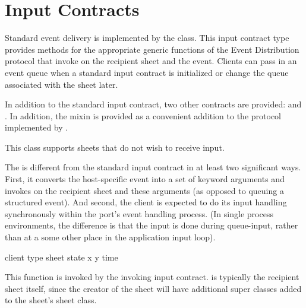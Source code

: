 {%


\section {Input Contracts}

Standard event delivery is implemented by the 
class.  This input contract type provides methods for the appropriate generic
functions of the Event Distribution protocol that invoke  on the
recipient sheet and the event.  Clients can pass in an event queue when a
standard input contract is initialized or change the queue associated with the
sheet later.



In addition to the standard input contract, two other contracts are provided:
 and .  In addition, the
 mixin is provided as a convenient addition to the
protocol implemented by .


This class supports sheets that do not wish to receive input.


The  is different from the standard input contract
in at least two significant ways.  First, it converts the host-specific event
into a set of keyword arguments and invokes  on the recipient
sheet and these arguments (as opposed to queuing a structured event).  And
second, the client is expected to do its input handling synchronously within the
port's event handling process.  (In single process environments, the difference
is that the input is done during queue-input, rather than at a some other place
in the application input loop).
        
 {client \key type sheet state x y time \allow} 

This function is invoked by the invoking input contract.   is
typically the recipient sheet itself, since the creator of the sheet will have
additional super classes added to the sheet's sheet class.

}
